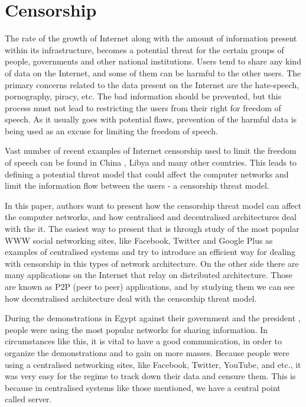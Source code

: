 \section{Censorship}
The rate of the growth of Internet along with the amount of information present within its infrastructure, becomes a potential threat for the certain groups of people, governments and other national institutions. Users tend to share any kind of data on the Internet, and some of them can be harmful to the other users. The primary concerns related to the data present on the Internet are the hate-speech, pornography, piracy, etc. The bad information should be prevented, but this process must not lead to restricting the users from their right for freedom of speech. As it usually goes with potential flaws, prevention of the harmful data is being used as an excuse for limiting the freedom of speech. 

Vast number of recent examples of Internet censorship used to limit the freedom of speech can be found in China \cite{canaves}, Libya \cite{dianotti2011} and many other countries. 
This leads to defining a potential threat model that could affect the computer networks and limit the information flow between the users - a censorship threat model.

In this paper, authors want to present how the censorship threat model can affect the computer networks, and how centralised and decentralised architectures deal with the it. The easiest way to present that is through study of the most popular WWW social networking sites, like Facebook, Twitter and Google Plus as examples of centralised systems and try to introduce an efficient way for dealing with censorship in this types of network architecture. On the other side there are many applications on the Internet that relay on distributed architecture. Those are known as P2P (peer to peer) applications, and by studying them we can see how decentralised architecture deal with the censorship threat model.

During the demonstrations in Egypt against their government and the president \cite{web:scialnetworkcriticalmass}, people were using the most popular networks for sharing information. In circumstances like this, it is vital to have a good communication, in order to organize the demonstrations and to gain on more masses. 
Because people were using a centralised networking sites, like Facebook, Twitter, YouTube, and etc., it was very easy for the regime to track down their data and censure them. This is because in centralised systems like those mentioned, we have a central point called server. 


